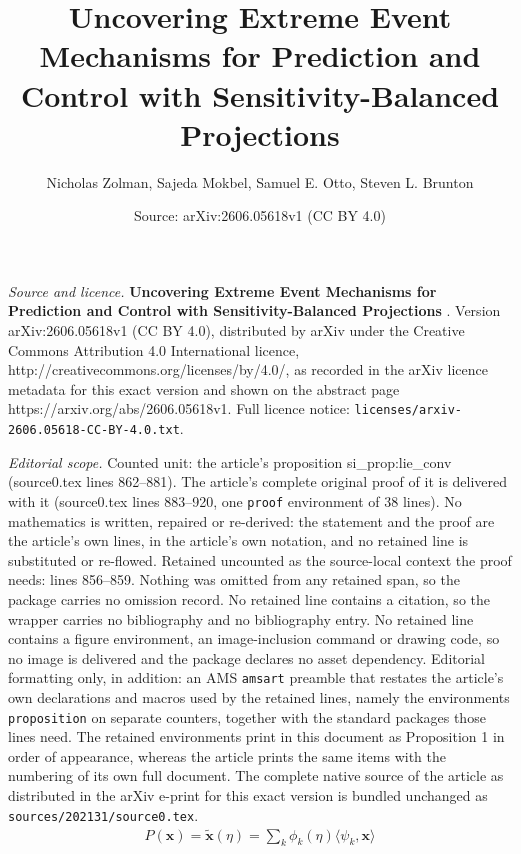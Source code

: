 \documentclass[10pt,a4paper]{amsart}
\title{\huge{\textbf{Uncovering Extreme Event Mechanisms for Prediction and Control with Sensitivity-Balanced Projections }}}
\author{Nicholas Zolman, Sajeda Mokbel, Samuel E. Otto, Steven L. Brunton}
\date{Source: arXiv:2606.05618v1 (CC BY 4.0)}
\begin{document}
\maketitle

\noindent\emph{Source and licence.} \huge{\textbf{Uncovering Extreme Event Mechanisms for Prediction and Control with Sensitivity-Balanced Projections }}. Version arXiv:2606.05618v1 (CC BY 4.0), distributed by arXiv under the Creative Commons Attribution 4.0 International licence, http://creativecommons.org/licenses/by/4.0/, as recorded in the arXiv licence metadata for this exact version and shown on the abstract page https://arxiv.org/abs/2606.05618v1. Full licence notice: \texttt{licenses/arxiv-2606.05618-CC-BY-4.0.txt}.\par\smallskip

\noindent\textit{Editorial scope.} Counted unit: the article's proposition si\_prop:lie\_conv (source0.tex lines 862--881). The article's complete original proof of it is delivered with it (source0.tex lines 883--920, one \texttt{proof} environment of 38 lines). No mathematics is written, repaired or re-derived: the statement and the proof are the article's own lines, in the article's own notation, and no retained line is substituted or re-flowed.  Retained uncounted as the source-local context the proof needs: lines 856--859.  Nothing was omitted from any retained span, so the package carries no omission record.  No retained line contains a citation, so the wrapper carries no bibliography and no bibliography entry.  No retained line contains a figure environment, an image-inclusion command or drawing code, so no image is delivered and the package declares no asset dependency.  Editorial formatting only, in addition: an AMS \texttt{amsart} preamble that restates the article's own declarations and macros used by the retained lines, namely the environments \texttt{proposition} on separate counters, together with the standard packages those lines need.  The retained environments print in this document as Proposition 1 in order of appearance, whereas the article prints the same items with the numbering of its own full document.  The complete native source of the article as distributed in the arXiv e-print for this exact version is bundled unchanged as \texttt{sources/202131/source0.tex}.
\begin{align}
\label{eq:si_local_recon}
    P(\mathbf x) = \mathbf{\tilde x}(\eta) = \sum_k \phi_k(\eta) \langle \psi_k, \mathbf x\rangle    
\end{align}
\end{document}
